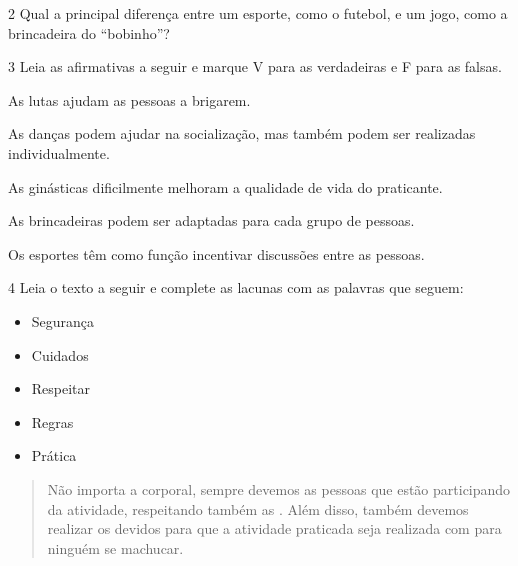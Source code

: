 
\num{2} Qual a principal diferença entre um esporte, como o futebol, e um
  jogo, como a brincadeira do ``bobinho''?


\num{3} Leia as afirmativas a seguir e marque V para as verdadeiras e F para
  as falsas.

\begin{boxlist}
\item As lutas ajudam as pessoas a brigarem. 

\item As danças podem ajudar na socialização, mas também podem ser realizadas individualmente. 

\item As ginásticas dificilmente melhoram a qualidade de vida do praticante. 

\item As brincadeiras podem ser adaptadas para cada grupo de pessoas. 

\item Os esportes têm como função incentivar discussões entre as pessoas. 
\end{boxlist}


\num{4} Leia o texto a seguir e complete as lacunas com as palavras que seguem:

\begin{itemize}
\item Segurança 
\item Cuidados 
\item Respeitar 
\item Regras 
\item Prática
\end{itemize}

\begin{quote}
Não importa a \preencher{} corporal, sempre devemos \preencher{} as pessoas que
estão participando da atividade, respeitando também as \preencher{}. Além
disso, também devemos realizar os devidos \preencher{} para que a atividade
praticada seja realizada com \preencher{} para ninguém se machucar.
\end{quote}

